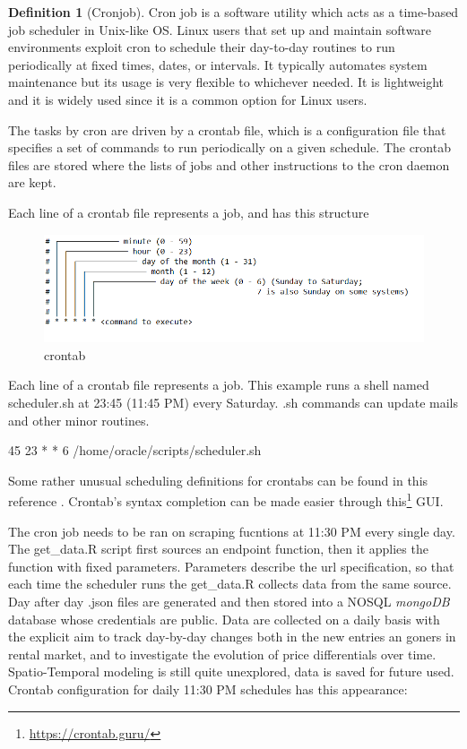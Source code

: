 \documentclass[
  12pt,
  a4paper,
  oneside]{book}
\DeclareRobustCommand{\href}[2]{#2\footnote{\url{#1}}}
\theoremstyle{definition}
\newtheorem{definition}{Definition}[chapter]
\theoremstyle{definition}
\theoremstyle{definition}
\theoremstyle{remark}
\begin{document}
\begin{definition}[Cronjob]
\protect\hypertarget{def:cronjob}{}{\label{def:cronjob} {} }Cron job is a software utility which acts as a time-based job scheduler in Unix-like OS. Linux users that set up and maintain software environments exploit cron to schedule their day-to-day routines to run periodically at fixed times, dates, or intervals. It typically automates system maintenance but its usage is very flexible to whichever needed. It is lightweight and it is widely used since it is a common option for Linux users.
\end{definition}
The tasks by cron are driven by a crontab file, which is a configuration file that specifies a set of commands to run periodically on a given schedule. The crontab files are stored where the lists of jobs and other instructions to the cron daemon are kept.

Each line of a crontab file represents a job, and has this structure

\begin{figure}
\centering
\includegraphics{images/crontab.PNG}
\caption{crontab}
\end{figure}

Each line of a crontab file represents a job. This example runs a shell named scheduler.sh at 23:45 (11:45 PM) every Saturday. .sh commands can update mails and other minor routines.

45 23 * * 6 /home/oracle/scripts/scheduler.sh

Some rather unusual scheduling definitions for crontabs can be found in this reference \citep{wiki:cronjob}. Crontab's syntax completion can be made easier through \href{https://crontab.guru/}{this} GUI.

The cron job needs to be ran on scraping fucntions at 11:30 PM every single day. The get\_data.R script first sources an endpoint function, then it applies the function with fixed parameters. Parameters describe the url specification, so that each time the scheduler runs the get\_data.R collects data from the same source. Day after day .json files are generated and then stored into a NOSQL \emph{mongoDB} database whose credentials are public. Data are collected on a daily basis with the explicit aim to track day-by-day changes both in the new entries an goners in rental market, and to investigate the evolution of price differentials over time. Spatio-Temporal modeling is still quite unexplored, data is saved for future used. Crontab configuration for daily 11:30 PM schedules has this appearance:
\end{document}
